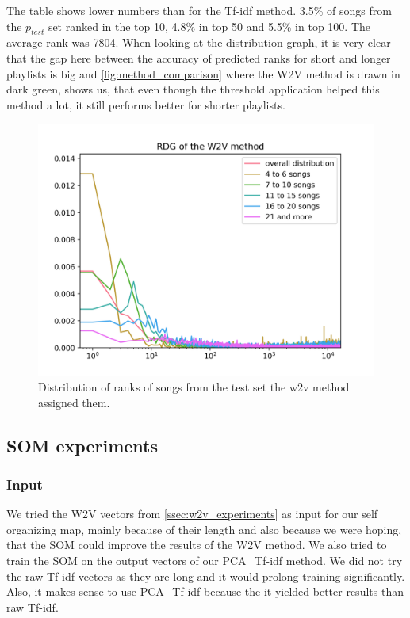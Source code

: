 The table shows lower numbers than for the Tf-idf method. 3.5\% of songs from the $ p_{test} $ set ranked in the top 10, 4.8\% in top 50 and 5.5\% in top 100. The average rank was 7804. When looking at the distribution graph, it is very clear that the gap here between the accuracy of predicted ranks for short and longer playlists is big and \ref{fig:method_comparison} where the W2V method is drawn in dark green, shows us, that even though the threshold application helped this method a lot, it still performs better for shorter playlists. 

\begin{figure}[h]
    \centering
	\includegraphics[width=120mm]{./img/w2v_graph.png}
	\caption{Distribution of ranks of songs from the test set the w2v method assigned them.}
	\label{fig:w2v_distribution}
\end{figure}

\subsection{SOM experiments}

\subsubsection{Input}
We tried the W2V vectors from \ref{ssec:w2v_experiments} as input for our self organizing map, mainly because of their length and also because we were hoping, that the SOM could improve the results of the W2V method. We also tried to train the SOM on the output vectors of our PCA\_Tf-idf method. We did not try the raw Tf-idf vectors as they are long and it would prolong training significantly. Also, it makes sense to use PCA\_Tf-idf because the it yielded better results than raw Tf-idf.

